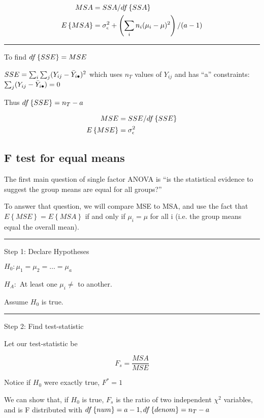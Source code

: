 \documentclass[10pt]{article}
\newcommand{\emphas}[1]{\colorbox{DarkSeaGreen2}{#1}}
\newcommand{\mean}[1]{\mu_{#1}}
\renewcommand{\exp}[1]{E\left\{#1\right\}} %
\newcommand{\sigvar}[1]{\sigma^2_{#1}} %
\newcommand{\drawline}{\noindent\rule{\linewidth}{0.1pt}}
\begin{document}
\begin{multicols}{3}
    \begin{align*}
        MSA & = SSA/\df{SSA} \\
        \exp{MSA} & = \sigvar{\epsilon} + \left(\sum_i n_i (\mean{i} - \mu )^2\right)/(a-1)
    \end{align*}

    \drawline

    To find $df\left\{SSE\right\} = MSE$

    $SSE = \sum_i \sum_j (Y_{ij} - \bar Y_{i\bullet})^2$ which uses $n_T$ values of $Y_{ij}$ and has ``a'' constraints: $\sum_j (Y_{ij} - \bar Y_{i\bullet}) = 0$

    Thus $df\left\{SSE\right\} = n_T - a$

    \begin{align*}
        MSE & = SSE/\df{SSE} \\
        \exp{MSE} & = \sigvar{\epsilon}
    \end{align*}

    \subsection{F test for equal means}

    The first main question of single factor ANOVA is ``is the statistical evidence to suggest the group means are equal for all groups?''

    To answer that question, we will compare MSE to MSA, and use the fact that $\exp{MSE} = \exp{MSA}$ if and only if $\mean{i} = \mu$ for all i (i.e. the group means equal the overall mean).

    \drawline

    Step 1: Declare \emphas{Hypotheses}

    $H_0: \mean{1} = \mean{2} = \dots = \mean{a}$

    $H_A:$ At least one $\mean{i} \ne$ to another.

    Assume $H_0$ is true.

    \drawline
    
    Step 2: Find \emphas{test-statistic}

    Let our test-statistic be 

    \begin{equation*}
        F_s = \frac{MSA}{MSE}
    \end{equation*}

    Notice if $H_0$ were exactly true, $F^* = 1$

    We can show that, if $H_0$ is true, $F_s$ is the ratio of two independent $\chi^2$ variables, and is F distributed with $df\left\{num\right\} = a-1, df\left\{denom\right\}=n_T-a$


\end{multicols}
\end{document}
